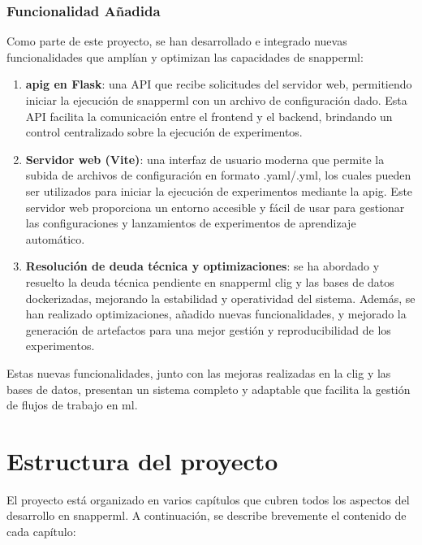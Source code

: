 \subsubsection{Funcionalidad Añadida}

Como parte de este proyecto, se han desarrollado e integrado nuevas funcionalidades que amplían y optimizan las capacidades de \Gls{snapperml}:

\begin{enumerate}
    \item \textbf{\Gls{apig} en Flask}: una API que recibe solicitudes del servidor web, permitiendo iniciar la ejecución de \Gls{snapperml} con un archivo de configuración dado. Esta API facilita la comunicación entre el frontend y el backend, brindando un control centralizado sobre la ejecución de experimentos.

    \item \textbf{Servidor web (Vite)}: una interfaz de usuario moderna que permite la subida de archivos de configuración en formato .yaml/.yml, los cuales pueden ser utilizados para iniciar la ejecución de experimentos mediante la \Gls{apig}. Este servidor web proporciona un entorno accesible y fácil de usar para gestionar las configuraciones y lanzamientos de experimentos de aprendizaje automático.
    \item \textbf{Resolución de deuda técnica y optimizaciones}: se ha abordado y resuelto la deuda técnica pendiente en \Gls{snapperml} \Gls{clig} y las bases de datos dockerizadas, mejorando la estabilidad y operatividad del sistema. Además, se han realizado optimizaciones, añadido nuevas funcionalidades, y mejorado la generación de artefactos para una mejor gestión y reproducibilidad de los experimentos.
\end{enumerate}

Estas nuevas funcionalidades, junto con las mejoras realizadas en la \Gls{clig} y las bases de datos, presentan un sistema completo y adaptable que facilita la gestión de flujos de trabajo en \acrlong{ml}.

\section{Estructura del proyecto}
El proyecto está organizado en varios capítulos que cubren todos los aspectos del desarrollo en \Gls{snapperml}. A continuación, se describe brevemente el contenido de cada capítulo:

